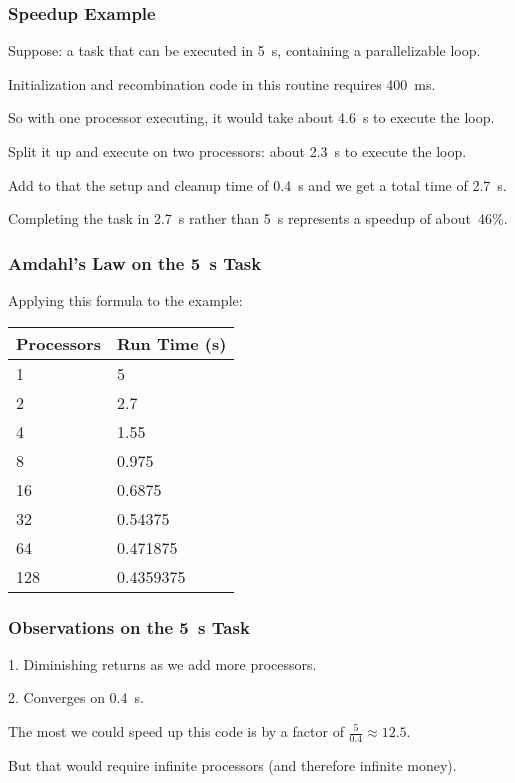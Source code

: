 \begin{frame}
\frametitle{Speedup Example}


Suppose: a task that can be executed in 5~s, containing a parallelizable loop.

Initialization and recombination code in this routine requires 400~ms. 

So with one processor executing, it would take about 4.6~s to execute the loop. 

Split it up and execute on two processors: about 2.3~s to execute the loop. 

Add to that the setup and cleanup time of 0.4~s and we get a total time of 2.7~s. 

Completing the task in 2.7~s rather than 5~s represents a speedup of about~46\%.

\end{frame}


\begin{frame}
\frametitle{Amdahl's Law on the 5~s Task}

Applying this formula to the example:

\begin{center}
	\begin{tabular}{l|l}
	\textbf{Processors} & \textbf{Run Time (s)} \\ \hline
	1 & 5\\
	2 & 2.7\\
	4 & 1.55\\
	8 & 0.975\\
	16 & 0.6875 \\
	32 & 0.54375 \\
	64 & 0.471875 \\
	128 & 0.4359375\\
	\end{tabular}
\end{center}

\end{frame}

 
\begin{frame}
\frametitle{Observations on the 5~s Task}

1. Diminishing returns as we add more processors.

2. Converges on 0.4~s.

The most we could speed up this code is by a factor of $\frac{5}{0.4}\approx 12.5$.

But that would require infinite processors (and therefore infinite money).

\end{frame}

